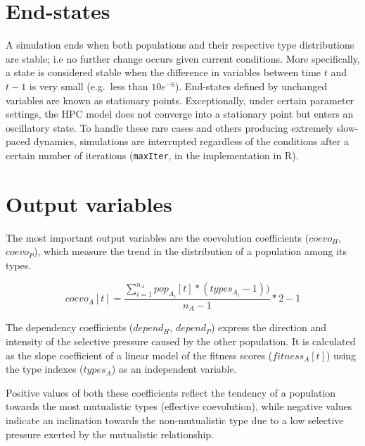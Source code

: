 \documentclass[
]{book}
\begin{document}
\newpage

\hypertarget{end-states}{%
\section*{End-states}\label{end-states}}

A simulation ends when both populations and their respective type distributions are stable; i.e no further change occurs given current conditions. More specifically, a state is considered stable when the difference in variables between time \(t\) and \(t-1\) is very small (e.g.~less than \(10e^{-6}\)). End-states defined by unchanged variables are known as stationary points. Exceptionally, under certain parameter settings, the HPC model does not converge into a stationary point but enters an oscillatory state. To handle these rare cases and others producing extremely slow-paced dynamics, simulations are interrupted regardless of the conditions after a certain number of iterations (\texttt{maxIter}, in the implementation in R).

\newpage

\hypertarget{output-variables}{%
\section*{Output variables}\label{output-variables}}

The most important output variables are the coevolution coefficients (\(coevo_H\), \(coevo_P\)), which measure the trend in the distribution of a population among its types.

\[coevo_A[t]=\frac{\sum_{i=1}^{n_A}pop_{A_i}[t] * (types_{A_i} - 1))}{n_A - 1} * 2 - 1\]

\begin{flushright}[Eq. 11]\end{flushright}

The dependency coefficients (\(depend_H\), \(depend_P\)) express the direction and intensity of the selective pressure caused by the other population. It is calculated as the slope coefficient of a linear model of the fitness scores (\(fitness_A[t]\)) using the type indexes (\(types_A\)) as an independent variable.

Positive values of both these coefficients reflect the tendency of a population towards the most mutualistic types (effective coevolution), while negative values indicate an inclination towards the non-mutualistic type due to a low selective pressure exerted by the mutualistic relationship.
\end{document}
